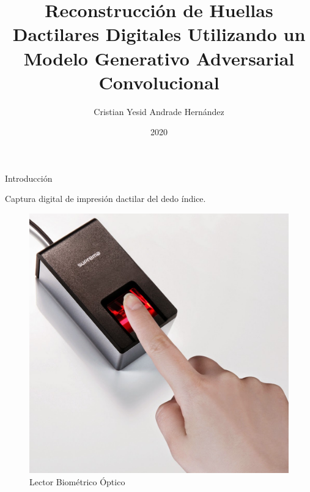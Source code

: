 \documentclass[12pt]{beamer}
\title{Reconstrucción de Huellas Dactilares Digitales Utilizando un Modelo Generativo Adversarial Convolucional}
\author{Cristian Yesid Andrade Hernández}
\institute{Universidad de los Andes}
\date{2020}
\begin{document}
\frame[plain]{\titlepage}

\begin{frame}{Introducción}

    Captura digital de impresión dactilar del dedo índice.

    \begin{figure}[h]
        \includegraphics[scale=0.15]{figs/dedo_lector_biometrico.jpg}
        \caption{Lector Biométrico Óptico}
    \end{figure}
    
\end{frame}
\end{document}
